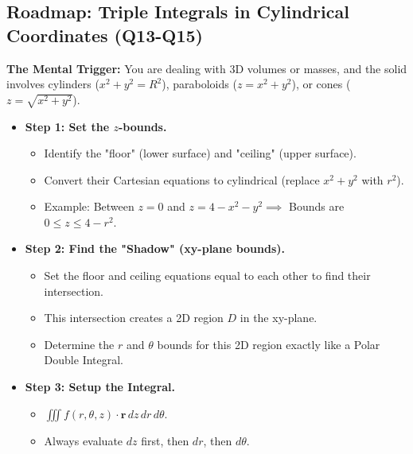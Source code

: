 \documentclass[11pt]{article}
\begin{document}
\subsection{Roadmap: Triple Integrals in Cylindrical Coordinates (Q13-Q15)}
\textbf{The Mental Trigger:} You are dealing with 3D volumes or masses, and the solid involves cylinders ($x^2+y^2=R^2$), paraboloids ($z=x^2+y^2$), or cones ($z=\sqrt{x^2+y^2}$).
\begin{itemize}
    \item \textbf{Step 1: Set the $z$-bounds.} 
    \begin{itemize}
        \item Identify the "floor" (lower surface) and "ceiling" (upper surface).
        \item Convert their Cartesian equations to cylindrical (replace $x^2+y^2$ with $r^2$).
        \item Example: Between $z=0$ and $z=4-x^2-y^2 \implies$ Bounds are $0 \le z \le 4-r^2$.
    \end{itemize}
    \item \textbf{Step 2: Find the "Shadow" (xy-plane bounds).}
    \begin{itemize}
        \item Set the floor and ceiling equations equal to each other to find their intersection.
        \item This intersection creates a 2D region $D$ in the xy-plane. 
        \item Determine the $r$ and $\theta$ bounds for this 2D region exactly like a Polar Double Integral.
    \end{itemize}
    \item \textbf{Step 3: Setup the Integral.}
    \begin{itemize}
        \item $\iiint f(r,\theta,z) \cdot \mathbf{r} \, dz \, dr \, d\theta$.
        \item Always evaluate $dz$ first, then $dr$, then $d\theta$.
    \end{itemize}
\end{itemize}
\end{document}
